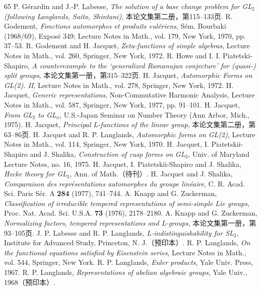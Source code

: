 \begin{thebibliography}{65}
 P. Gérardin and J.-P. Labesse, \emph{The solution of a base change problem for GL$_2$ (following Langlands, Saito, Shintani)}, 本论文集第二册，第115--133页.
 R. Godement, \emph{Fonctions automorphes et produits eulériens}, Sém. Bourbaki (1968/69), Exposé 349; Lecture Notes in Math., vol. 179, New York, 1970, pp. 37--53.
 R. Godement and H. Jacquet, \emph{Zeta-functions of simple algebras}, Lecture Notes in Math., vol. 260, Springer, New York, 1972.
 R. Howe and I. I. Piatetski-Shapiro, \emph{A counterexample to the `generalized Ramanujan conjecture' for (quasi-) split groups}, 本论文集第一册，第315--322页.
 H. Jacquet, \emph{Automorphic Forms on GL(2). II}, Lecture Notes in Math., vol. 278, Springer, New York, 1972.
 H. Jacquet, \emph{Generic representations}, Non-Commutative Harmonic Analysis, Lecture Notes in Math., vol. 587, Springer, New York, 1977, pp. 91--101.
 H. Jacquet, \emph{From GL$_2$ to GL$_n$}, U.S.-Japan Seminar on Number Theory (Ann Arbor, Mich., 1975).
 H. Jacquet, \emph{Principal L-functions of the linear group}, 本论文集第二册，第63--86页.
 H. Jacquet and R. P. Langlands, \emph{Automorphic forms on GL(2)}, Lecture Notes in Math., vol. 114, Springer, New York, 1970.
 H. Jacquet, I. Piatetskii-Shapiro and J. Shalika, \emph{Construction of cusp forms on GL$_3$}, Univ. of Maryland Lecture Notes, no. 16, 1975.
 H. Jacquet, I. Piatetskii-Shapiro and J. Shalika, \emph{Hecke theory for GL$_3$}, Ann. of Math.（待刊）.
 H. Jacquet and J. Shalika, \emph{Comparaison des représentations automorphes du groupe linéaire}, C. R. Acad. Sci. Paris Sér. A \textbf{284} (1977), 741--744.
 A. Knapp and G. Zuckerman, \emph{Classification of irreducible tempered representations of semi-simple Lie groups}, Proc. Nat. Acad. Sci. U.S.A. \textbf{73} (1976), 2178--2180.
 A. Knapp and G. Zuckerman, \emph{Normalizing factors, tempered representations and L-groups}, 本论文集第一册，第93--105页.
 J. P. Labesse and R. P. Langlands, \emph{L-indistinguishability for SL$_2$}, Institute for Advanced Study, Princeton, N. J.（预印本）.
 R. P. Langlands, \emph{On the functional equations satisfied by Eisenstein series}, Lecture Notes in Math., vol. 544, Springer, New York.
 R. P. Langlands, \emph{Euler products}, Yale Univ. Press, 1967.
 R. P. Langlands, \emph{Representations of abelian algebraic groups}, Yale Univ., 1968（预印本）.

\end{thebibliography}
